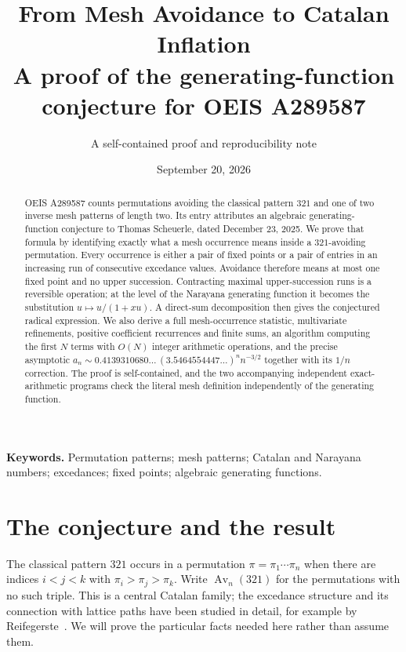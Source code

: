 \documentclass[11pt,letterpaper]{article}
\title{\color{inkblue}\textbf{From Mesh Avoidance to Catalan Inflation}\\[5pt]
  \large A proof of the generating-function conjecture for OEIS A289587}
\author{A self-contained proof and reproducibility note}
\date{September 20, 2026}
\numberwithin{equation}{section}
\theoremstyle{definition}
\DeclareMathOperator{\Av}{Av}
\begin{document}
\maketitle
\thispagestyle{empty}

\begin{abstract}
OEIS A289587 counts permutations avoiding the classical pattern $321$ and
one of two inverse mesh patterns of length two. Its entry attributes an
algebraic generating-function conjecture to Thomas Scheuerle, dated
December 23, 2025. We prove that formula by identifying exactly what a mesh
occurrence means inside a $321$-avoiding permutation. Every occurrence is
either a pair of fixed points or a pair of entries in an increasing run of
consecutive excedance values. Avoidance therefore means at most one fixed
point and no upper succession. Contracting maximal upper-succession runs
is a reversible operation; at the level of the Narayana generating function
it becomes the substitution $u\mapsto u/(1+xu)$. A direct-sum decomposition
then gives the conjectured radical expression. We also derive a full
mesh-occurrence statistic, multivariate refinements, positive coefficient
recurrences and finite sums, an algorithm computing the first $N$ terms with
$O(N)$ integer arithmetic operations, and the precise asymptotic
$a_n\sim 0.4139310680\ldots\,(3.5464554447\ldots)^n n^{-3/2}$ together with
its $1/n$ correction.
The proof is self-contained, and the two accompanying independent
exact-arithmetic programs check the literal mesh definition independently of
the generating function.
\end{abstract}

\vspace{5pt}
\noindent\textbf{Keywords.} Permutation patterns; mesh patterns; Catalan and
Narayana numbers; excedances; fixed points; algebraic generating functions.

\section{The conjecture and the result}
\label{sec:intro}

The classical pattern $321$ occurs in a permutation $\pi=\pi_1\cdots\pi_n$
when there are indices $i<j<k$ with $\pi_i>\pi_j>\pi_k$.
Write $\Av_n(321)$ for the permutations with no such triple. This is a
central Catalan family; the excedance structure and its connection with
lattice paths have been studied in detail, for example by
Reifegerste~\cite{reifegerste}. We will prove the particular facts needed
here rather than assume them.
\end{document}
